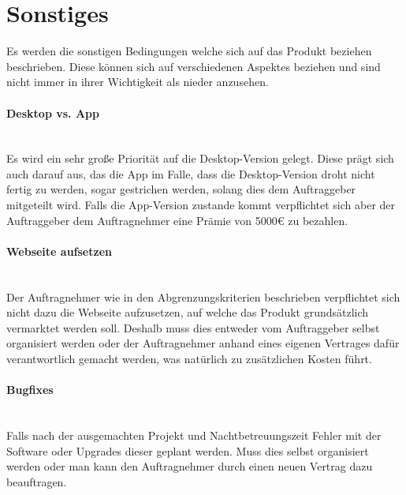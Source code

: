 \section{Sonstiges}
Es werden die sonstigen Bedingungen welche sich auf das Produkt beziehen beschrieben. Diese können sich auf verschiedenen Aspektes beziehen und sind nicht immer in ihrer Wichtigkeit als nieder anzusehen.

\begin{indentE}\mbox{}
	\paragraph{Desktop vs. App}\mbox{}\\
	Es wird ein sehr große Priorität auf die Desktop-Version gelegt. Diese prägt sich auch darauf aus, das die App im Falle, dass die Desktop-Version droht nicht fertig zu werden, sogar gestrichen werden, solang dies dem Auftraggeber mitgeteilt wird. Falls die App-Version zustande kommt verpflichtet sich aber der Auftraggeber dem Auftragnehmer eine Prämie von 5000€ zu bezahlen.
	
	\paragraph{Webseite aufsetzen}\mbox{}\\
	Der Auftragnehmer wie in den Abgrenzungskriterien beschrieben verpflichtet sich nicht dazu die Webseite aufzusetzen, auf welche das Produkt grundsätzlich vermarktet werden soll. Deshalb muss dies entweder vom Auftraggeber selbst organisiert werden oder der Auftragnehmer anhand eines eigenen Vertrages dafür verantwortlich gemacht werden, was natürlich zu zusätzlichen Kosten führt.
	
	\paragraph{Bugfixes}\mbox{}\\
	Falls nach der ausgemachten Projekt und Nachtbetreuungszeit Fehler mit der Software oder Upgrades dieser geplant werden. Muss dies selbst organisiert werden oder man kann den Auftragnehmer durch einen neuen Vertrag dazu beauftragen.
\end{indentE}
